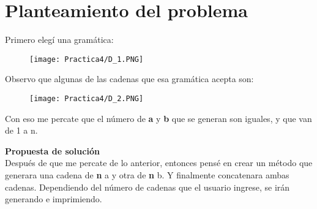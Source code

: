 \documentclass[12pt]{article}
\begin{document}

	\section{Planteamiento del problema}

	Primero elegí una gramática: 
	\begin{figure}[H]
	        \centering
	        \texttt{[image: Practica4/D\_1.PNG]}
	\end{figure}

	Observo que algunas de las cadenas que esa gramática acepta son:
	\begin{figure}[H]
	        \centering
	        \texttt{[image: Practica4/D\_2.PNG]}
	\end{figure}

	Con eso me percate que el número de \textbf{a} y \textbf{b} que se generan
	son iguales, y que van de 1 a n. 

	\textbf{Propuesta de solución} \\
	Después de que me percate de lo anterior, entonces pensé en crear un método
	que generara una cadena de \textbf{n} a y otra de \textbf{n} b. Y finalmente
	concatenara ambas cadenas. Dependiendo del número de cadenas que el usuario ingrese, se irán generando
	e imprimiendo.
\end{document}
